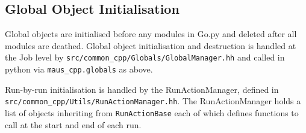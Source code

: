 \subsection{Global Object Initialisation}
Global objects are initialised before any modules in Go.py and deleted after all modules are deathed. Global object initialisation and destruction is handled at the Job level by \verb|src/common_cpp/Globals/GlobalManager.hh| and called in python via \verb|maus_cpp.globals| as above.

Run-by-run initialisation is handled by the RunActionManager, defined in \verb|src/common_cpp/Utils/RunActionManager.hh|. The RunActionManager holds a list of objects inheriting from \verb|RunActionBase| each of which defines functions to call at the start and end of each run.


